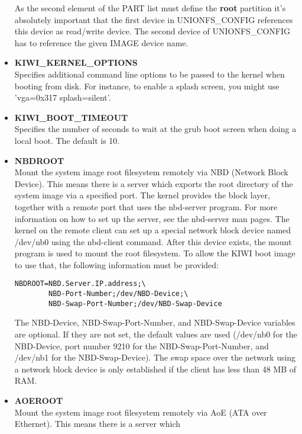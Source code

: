 \begin{itemize}
        As the second element of the PART list must define the \textbf{root}
        partition it's absolutely important that the first device in
        UNIONFS\_CONFIG references this device as read/write device.
        The second device of UNIONFS\_CONFIG has to reference the given
        IMAGE device name.
    \item \textbf{KIWI\_KERNEL\_OPTIONS}\\
        Specifies additional command line options to be passed to
        the kernel when booting from disk.  For instance, to enable
        a splash screen, you might use 'vga=0x317 splash=silent'.
    \item \textbf{KIWI\_BOOT\_TIMEOUT}\\
        Specifies the number of seconds to wait at the grub boot
        screen when doing a local boot.  The default is 10.
    \item \textbf{NBDROOT}\\
        Mount the system image root filesystem remotely via
        NBD (Network Block Device). This means there is a server
        which exports the root directory of the system image via a
        specified port. The kernel provides the block layer, together with a
        remote port that uses the nbd-server program. For more information
        on how to set up the server, see the nbd-server man pages. The
        kernel on the remote client can set up a special network block
        device named /dev/nb0 using the nbd-client command. After this
        device exists, the mount program is used to mount the root
        filesystem. To allow the KIWI boot image to use that, the following
        information must be provided:
\begin{verbatim}
NBDROOT=NBD.Server.IP.address;\
        NBD-Port-Number;/dev/NBD-Device;\
        NBD-Swap-Port-Number;/dev/NBD-Swap-Device
\end{verbatim}
        The NBD-Device, NBD-Swap-Port-Number, and NBD-Swap-Device
        variables are optional. If they are not set, the default values
        are used (/dev/nb0 for the NBD-Device, port number 9210 for the
        NBD-Swap-Port-Number, and /dev/nb1 for the NBD-Swap-Device).
        The swap space over the network using a network block device
        is only established if the client has less than 48 MB of RAM.
    \item \textbf{AOEROOT}\\
        Mount the system image root filesystem remotely via AoE
        (ATA over Ethernet). This means there is a server which

\end{itemize}
